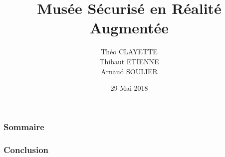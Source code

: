 \documentclass[10pt, c]{beamer}
\title{Musée Sécurisé en Réalité Augmentée}
\author{Théo CLAYETTE\\Thibaut ETIENNE\\Arnaud SOULIER}
\institute{Encadrés par\\William PUECH et Pauline PUTEAUX}
\date{29 Mai 2018}
\begin{document}
	\begin{frame}
	\titlepage
	\end{frame}

    \begin{frame}
        \frametitle{Sommaire}
        \tableofcontents[pausesections]
    \end{frame}

    
    
    

    \begin{frame}
        \frametitle{Conclusion}
    \end{frame}
\end{document}
